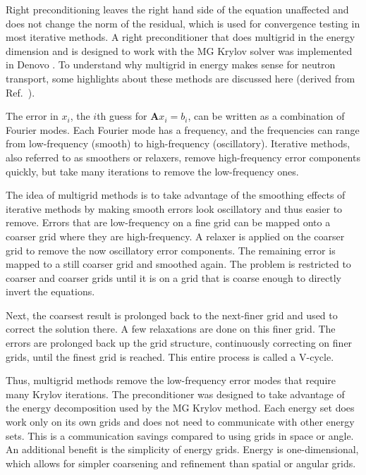 \documentclass[preprint,12pt]{elsarticle}
\newcommand{\ve}[1]{\ensuremath{\mathbf{#1}}}
\begin{document}
Right preconditioning leaves the right hand side of the equation unaffected and does not change the norm of the residual, which is used for convergence testing in most iterative methods. A right preconditioner that does multigrid in the energy dimension and is designed to work with the MG Krylov solver was implemented in Denovo \cite{Slaybaugh2013}. To understand why multigrid in energy makes sense for neutron transport, some highlights about these methods are discussed here (derived from Ref.\ \cite{Briggs2000}). 

The error in $x_i$, the $i$th guess for $\ve{A}x_i=b_i$, can be written as a combination of Fourier modes. Each Fourier mode has a frequency, and the frequencies can range from low-frequency (smooth) to high-frequency (oscillatory). Iterative methods, also referred to as smoothers or relaxers, remove high-frequency error components quickly, but take many iterations to remove the low-frequency ones. 

The idea of multigrid methods is to take advantage of the smoothing effects of iterative methods by making smooth errors look oscillatory and thus easier to remove. Errors that are low-frequency on a fine grid can be mapped onto a coarser grid where they are high-frequency. A relaxer is applied on the coarser grid to remove the now oscillatory error components. The remaining error is mapped to a still coarser grid and smoothed again. The problem is restricted to coarser and coarser grids until it is on a grid that is coarse enough to directly invert the equations.

Next, the coarsest result is prolonged back to the next-finer grid and used to correct the solution there. A few relaxations are done on this finer grid. The errors are prolonged back up the grid structure, continuously correcting on finer grids, until the finest grid is reached. This entire process is called a V-cycle. %
 
Thus, multigrid methods remove the low-frequency error modes that require many Krylov iterations. The preconditioner was designed to take advantage of the energy decomposition used by the MG Krylov method. Each energy set does work only on its own grids and does not need to communicate with other energy sets. This is a communication savings compared to using grids in space or angle. An additional benefit is the simplicity of energy grids. Energy is one-dimensional, which allows for simpler coarsening and refinement than spatial or angular grids.
\end{document}
